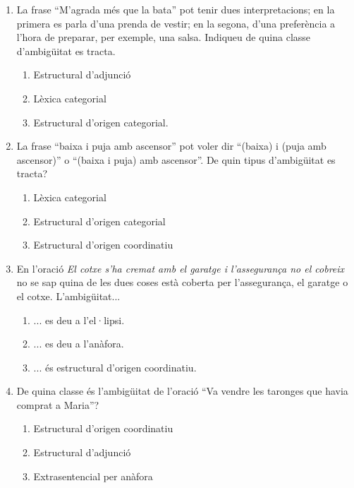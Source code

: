\begin{enumerate}
\item La frase ``M'agrada més que la bata'' pot tenir dues
  interpretacions; en la primera es parla d'una prenda de vestir; en
  la segona, d'una preferència a l'hora de preparar, per exemple, una
  salsa. Indiqueu de quina classe d'ambigüitat es tracta.
  \begin{enumerate}
  \item Estructural d'adjunció
  \item Lèxica categorial
  \item Estructural d'origen categorial.
  \end{enumerate}

\item La frase ``baixa i puja amb ascensor'' pot voler dir ``(baixa) i
  (puja amb ascensor)'' o ``(baixa i puja) amb ascensor''.  De quin
  tipus d'ambigüitat es tracta?
  \begin{enumerate}
  \item Lèxica categorial
  \item Estructural d'origen categorial
  \item Estructural d'origen coordinatiu
  \end{enumerate}

\item En l'oració \emph{El cotxe s'ha cremat amb el garatge i
    l'assegurança no el cobreix} no se sap quina de les dues coses
  està coberta per l'assegurança, el garatge o el
  cotxe. L'ambigüitat...
  \begin{enumerate}
  \item ... es deu a l'el·lipsi.
  \item ... es deu a l'anàfora.
  \item ... és estructural d'origen coordinatiu.
  \end{enumerate}

\item De quina classe és l'ambigüitat de l'oració ``Va vendre les
  taronges que havia comprat a Maria''?
  \begin{enumerate}
  \item Estructural d'origen coordinatiu
  \item Estructural d'adjunció
  \item Extrasentencial per anàfora
\end{enumerate}


\end{enumerate}
